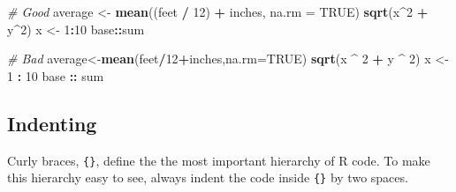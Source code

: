 \documentclass[]{book}
\newenvironment{Shaded}{\begin{snugshade}}{\end{snugshade}}
\newcommand{\CommentTok}[1]{\textcolor[rgb]{0.56,0.35,0.01}{\textit{#1}}}
\newcommand{\DataTypeTok}[1]{\textcolor[rgb]{0.13,0.29,0.53}{#1}}
\newcommand{\DecValTok}[1]{\textcolor[rgb]{0.00,0.00,0.81}{#1}}
\newcommand{\KeywordTok}[1]{\textcolor[rgb]{0.13,0.29,0.53}{\textbf{#1}}}
\newcommand{\NormalTok}[1]{#1}
\newcommand{\OperatorTok}[1]{\textcolor[rgb]{0.81,0.36,0.00}{\textbf{#1}}}
\newcommand{\OtherTok}[1]{\textcolor[rgb]{0.56,0.35,0.01}{#1}}
\newcommand{\StringTok}[1]{\textcolor[rgb]{0.31,0.60,0.02}{#1}}
\theoremstyle{definition}
\theoremstyle{definition}
\theoremstyle{definition}
\theoremstyle{remark}
\begin{document}
\begin{Shaded}
\begin{Highlighting}[]
\CommentTok{# Good}
\NormalTok{average <-}\StringTok{ }\KeywordTok{mean}\NormalTok{((feet }\OperatorTok{/}\StringTok{ }\DecValTok{12}\NormalTok{) }\OperatorTok{+}\StringTok{ }\NormalTok{inches, }\DataTypeTok{na.rm =} \OtherTok{TRUE}\NormalTok{)}
\KeywordTok{sqrt}\NormalTok{(x}\OperatorTok{^}\DecValTok{2} \OperatorTok{+}\StringTok{ }\NormalTok{y}\OperatorTok{^}\DecValTok{2}\NormalTok{)}
\NormalTok{x <-}\StringTok{ }\DecValTok{1}\OperatorTok{:}\DecValTok{10}
\NormalTok{base}\OperatorTok{::}\NormalTok{sum}

\CommentTok{# Bad}
\NormalTok{average<-}\KeywordTok{mean}\NormalTok{(feet}\OperatorTok{/}\DecValTok{12}\OperatorTok{+}\NormalTok{inches,}\DataTypeTok{na.rm=}\OtherTok{TRUE}\NormalTok{)}
\KeywordTok{sqrt}\NormalTok{(x }\OperatorTok{^}\StringTok{ }\DecValTok{2} \OperatorTok{+}\StringTok{ }\NormalTok{y }\OperatorTok{^}\StringTok{ }\DecValTok{2}\NormalTok{)}
\NormalTok{x <-}\StringTok{ }\DecValTok{1} \OperatorTok{:}\StringTok{ }\DecValTok{10}
\NormalTok{base }\OperatorTok{::}\StringTok{ }\NormalTok{sum}
\end{Highlighting}
\end{Shaded}

\hypertarget{indenting}{%
\subsection{Indenting}\label{indenting}}

Curly braces, \texttt{\{\}}, define the the most important hierarchy of
R code. To make this hierarchy easy to see, always indent the code
inside \texttt{\{\}} by two spaces.
\end{document}

